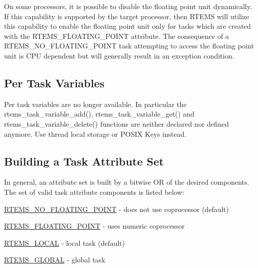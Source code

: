 On some processors, it is possible to disable the floating point unit dynamically. If this capability is supported by the target processor, then R\+T\+E\+MS will utilize this capability to enable the floating point unit only for tasks which are created with the {\ttfamily R\+T\+E\+M\+S\+\_\+\+F\+L\+O\+A\+T\+I\+N\+G\+\_\+\+P\+O\+I\+NT} attribute. The consequence of a {\ttfamily R\+T\+E\+M\+S\+\_\+\+N\+O\+\_\+\+F\+L\+O\+A\+T\+I\+N\+G\+\_\+\+P\+O\+I\+NT} task attempting to access the floating point unit is C\+PU dependent but will generally result in an exception condition.\hypertarget{group__ClassicTasks_ClassicTasksSecPerTaskVariables}{}\subsection{Per Task Variables}\label{group__ClassicTasks_ClassicTasksSecPerTaskVariables}
Per task variables are no longer available. In particular the rtems\+\_\+task\+\_\+variable\+\_\+add(), rtems\+\_\+task\+\_\+variable\+\_\+get() and rtems\+\_\+task\+\_\+variable\+\_\+delete() functions are neither declared nor defined anymore. Use thread local storage or P\+O\+S\+IX Keys instead.\hypertarget{group__ClassicTasks_ClassicTasksSecBuildingTaskAttributeSet}{}\subsection{Building a Task Attribute Set}\label{group__ClassicTasks_ClassicTasksSecBuildingTaskAttributeSet}
In general, an attribute set is built by a bitwise OR of the desired components. The set of valid task attribute components is listed below\+:


\begin{DoxyItemize}
\item \mbox{\hyperlink{group__ClassicAttributes_ga514fb0bc840344fb4b221b646a30f5c2}{R\+T\+E\+M\+S\+\_\+\+N\+O\+\_\+\+F\+L\+O\+A\+T\+I\+N\+G\+\_\+\+P\+O\+I\+NT}} -\/ does not use coprocessor (default)
\item \mbox{\hyperlink{group__ClassicAttributes_gac0368fd84c0d3e0f969d72afc5126881}{R\+T\+E\+M\+S\+\_\+\+F\+L\+O\+A\+T\+I\+N\+G\+\_\+\+P\+O\+I\+NT}} -\/ uses numeric coprocessor
\item \mbox{\hyperlink{group__ClassicAttributes_ga12f6eed44135cc4b948bb03f01c97b27}{R\+T\+E\+M\+S\+\_\+\+L\+O\+C\+AL}} -\/ local task (default)
\item \mbox{\hyperlink{group__ClassicAttributes_ga2c0c459a320511d71b3390e916a1d3f0}{R\+T\+E\+M\+S\+\_\+\+G\+L\+O\+B\+AL}} -\/ global task
\end{DoxyItemize}

